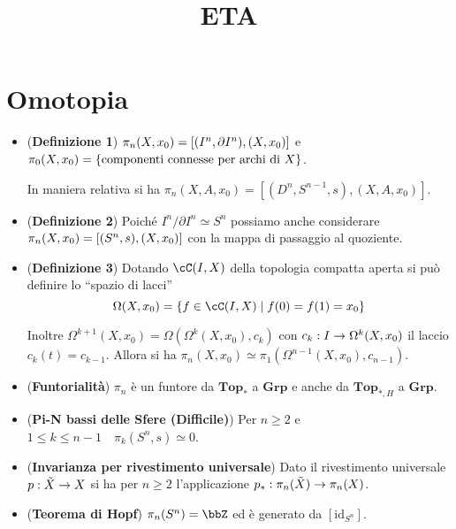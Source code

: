 \documentclass[a4paper,NoNotes,GeneralMath]{stdmdoc}
\title{ETA}
\newcommand{\Top}{\textbf{Top}}
\newcommand{\Grp}{\textbf{Grp}}
\newcommand{\id}{\text{id}}
\begin{document}
\section*{Omotopia}
\begin{itemize}
\item ({\bf Definizione 1}) $\pi_n (X, x_0) = \left[{(I^n, \partial I^n), (X, x_0)}\right]$ e $\pi_0 (X, x_0) = \left\{{\text{componenti connesse per archi di } X}\right\}$.

  In maniera relativa si ha $\pi_n (X, A, x_0) = [(D^n, S^{n-1}, s), (X, A, x_0)]$.  
\item ({\bf Definizione 2}) Poiché $I^n / \partial I^n \simeq S^n$ possiamo anche considerare $\pi_n (X, x_0) = \left[{(S^n, s), (X, x_0)}\right]$ con la mappa di passaggio al quoziente.
\item ({\bf Definizione 3}) Dotando $\cC(I, X)$ della topologia compatta aperta si può definire lo ``spazio di lacci''
  $$ \Omega (X, x_0) = \lrg{ f \in \cC(I, X) \mid f(0) = f(1) = x_0 } $$

  Inoltre $\Omega^{k+1} (X, x_0) = \Omega (\Omega^k (X, x_0), c_k)$ con $c_k: I \rightarrow \Omega^{k}(X, x_0)$ il laccio $c_k(t) = c_{k-1}$.
  Allora si ha $\pi_n (X, x_0) \simeq \pi_1 (\Omega^{n-1}(X, x_0), c_{n-1})$.
\item ({\bf Funtorialità}) $\pi_n$ è un funtore da $\Top_*$ a $\Grp$ e anche da $\Top_{*, H}$ a $\Grp$.
\item ({\bf Pi-N bassi delle Sfere (Difficile)}) Per $n \ge 2$ e $1 \le k \le n - 1 \quad \pi_k (S^n, s) \simeq 0$.
\item ({\bf Invarianza per rivestimento universale}) Dato il rivestimento universale $p: \tilde{X} \rightarrow X$ si ha per $n \ge 2$ l'applicazione $p_*: \pi_n(\tilde{X}) \rightarrow \pi_n(X)$.
\item ({\bf Teorema di Hopf}) $\pi_n(S^n) = \bbZ$ ed è generato da $[\id_{S^n}]$.
\end{itemize}
\end{document}
